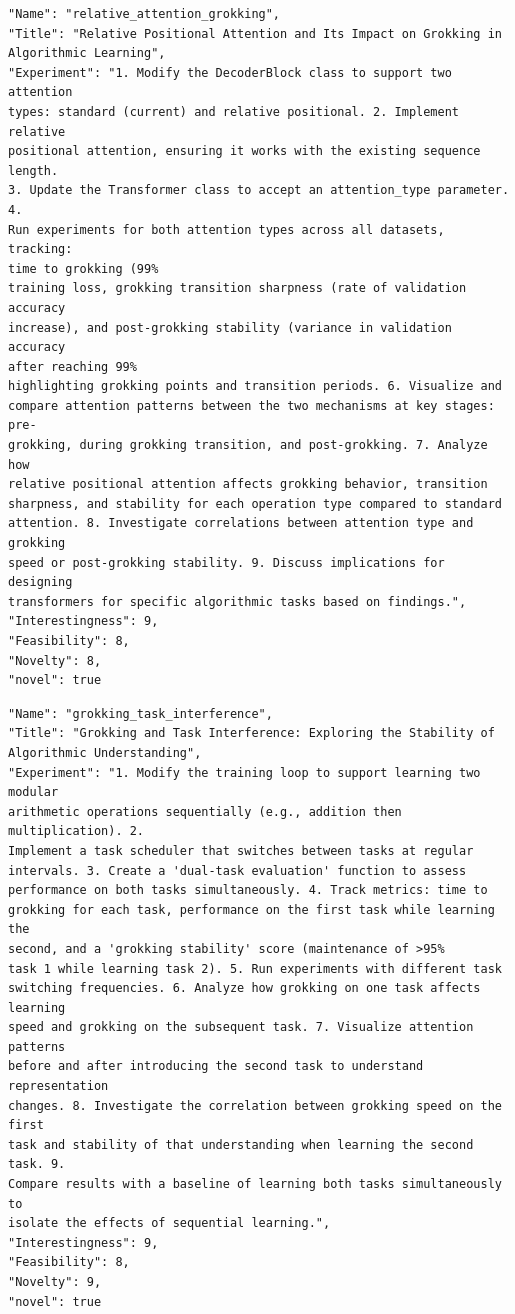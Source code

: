 \documentclass[11pt, a4paper]{include/gdm_format}
\begin{document}
\begin{tcolorbox}[breakable,colback=blue!5!white, colframe=blue!75!black, title=Idea 35/50 - \texttt{relative\_attention\_grokking}]
\small
\begin{verbatim}
"Name": "relative_attention_grokking",
"Title": "Relative Positional Attention and Its Impact on Grokking in
Algorithmic Learning",
"Experiment": "1. Modify the DecoderBlock class to support two attention
types: standard (current) and relative positional. 2. Implement relative
positional attention, ensuring it works with the existing sequence length.
3. Update the Transformer class to accept an attention_type parameter. 4.
Run experiments for both attention types across all datasets, tracking:
time to grokking (99%
training loss, grokking transition sharpness (rate of validation accuracy
increase), and post-grokking stability (variance in validation accuracy
after reaching 99%
highlighting grokking points and transition periods. 6. Visualize and
compare attention patterns between the two mechanisms at key stages: pre-
grokking, during grokking transition, and post-grokking. 7. Analyze how
relative positional attention affects grokking behavior, transition
sharpness, and stability for each operation type compared to standard
attention. 8. Investigate correlations between attention type and grokking
speed or post-grokking stability. 9. Discuss implications for designing
transformers for specific algorithmic tasks based on findings.",
"Interestingness": 9,
"Feasibility": 8,
"Novelty": 8,
"novel": true
\end{verbatim}
\end{tcolorbox}

\begin{tcolorbox}[breakable,colback=blue!5!white, colframe=blue!75!black, title=Idea 36/50 - \texttt{grokking\_task\_interference}]
\small
\begin{verbatim}
"Name": "grokking_task_interference",
"Title": "Grokking and Task Interference: Exploring the Stability of
Algorithmic Understanding",
"Experiment": "1. Modify the training loop to support learning two modular
arithmetic operations sequentially (e.g., addition then multiplication). 2.
Implement a task scheduler that switches between tasks at regular
intervals. 3. Create a 'dual-task evaluation' function to assess
performance on both tasks simultaneously. 4. Track metrics: time to
grokking for each task, performance on the first task while learning the
second, and a 'grokking stability' score (maintenance of >95%
task 1 while learning task 2). 5. Run experiments with different task
switching frequencies. 6. Analyze how grokking on one task affects learning
speed and grokking on the subsequent task. 7. Visualize attention patterns
before and after introducing the second task to understand representation
changes. 8. Investigate the correlation between grokking speed on the first
task and stability of that understanding when learning the second task. 9.
Compare results with a baseline of learning both tasks simultaneously to
isolate the effects of sequential learning.",
"Interestingness": 9,
"Feasibility": 8,
"Novelty": 9,
"novel": true
\end{verbatim}
\end{tcolorbox}
\end{document}
